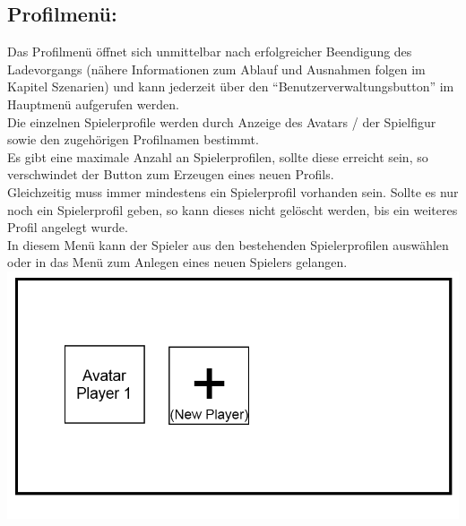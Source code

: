 \documentclass{scrartcl}
\begin{document}
\begin{enumerate}
\begin{minipage}{1\textwidth}
		\item \subsection*{Profilmenü:} \label{appaufbau:Profilmenue}
		Das Profilmenü öffnet sich unmittelbar nach erfolgreicher Beendigung des Ladevorgangs (nähere Informationen zum Ablauf und Ausnahmen folgen im Kapitel Szenarien) und kann jederzeit über den \enquote{Benutzerverwaltungsbutton} im Hauptmenü aufgerufen werden.\\
		Die einzelnen Spielerprofile werden durch Anzeige des Avatars / der Spielfigur sowie den zugehörigen Profilnamen bestimmt.\\
		Es gibt eine maximale Anzahl an Spielerprofilen, sollte diese erreicht sein, so verschwindet der Button zum Erzeugen eines neuen Profils.\\
		Gleichzeitig muss immer mindestens ein Spielerprofil vorhanden sein. Sollte es nur noch ein Spielerprofil geben, so kann dieses nicht gelöscht werden, bis ein weiteres Profil angelegt wurde.\\
		In diesem Menü kann der Spieler aus den bestehenden Spielerprofilen auswählen oder in das Menü zum Anlegen eines neuen Spielers gelangen.\\
		\includegraphics[scale=0.5]{assets/PlayerScreen}
	\end{minipage}
	

\end{enumerate}
\end{document}
